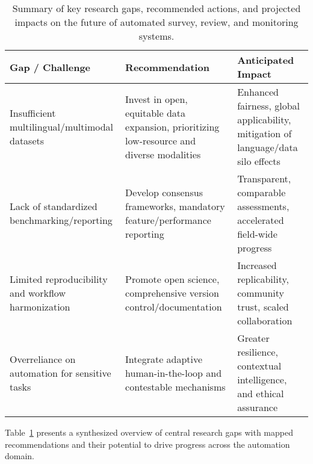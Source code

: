 \documentclass[11pt]{article}
\begin{document}
\begin{table}[ht]
\centering
\begin{tabular}{|p{3cm}|p{5cm}|p{5cm}|}
\hline
\textbf{Gap / Challenge} & \textbf{Recommendation} & \textbf{Anticipated Impact} \\
\hline
Insufficient multilingual/multimodal datasets & Invest in open, equitable data expansion, prioritizing low-resource and diverse modalities & Enhanced fairness, global applicability, mitigation of language/data silo effects \\
Lack of standardized benchmarking/reporting     & Develop consensus frameworks, mandatory feature/performance reporting     & Transparent, comparable assessments, accelerated field-wide progress \\
Limited reproducibility and workflow harmonization   & Promote open science, comprehensive version control/documentation & Increased replicability, community trust, scaled collaboration \\
Overreliance on automation for sensitive tasks & Integrate adaptive human-in-the-loop and contestable mechanisms & Greater resilience, contextual intelligence, and ethical assurance    \\
\hline
\end{tabular}
\caption{Summary of key research gaps, recommended actions, and projected impacts on the future of automated survey, review, and monitoring systems.}
\label{tab:research_gaps_summary}
\end{table}

Table~\ref{tab:research_gaps_summary} presents a synthesized overview of central research gaps with mapped recommendations and their potential to drive progress across the automation domain.



\end{document}
